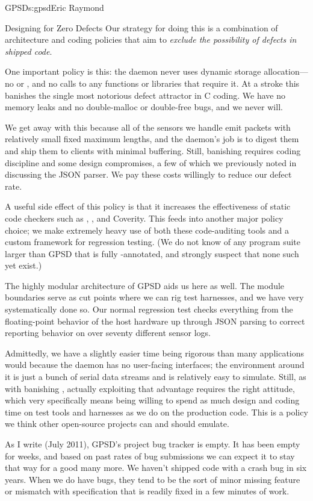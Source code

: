 \begin{aosachapter}{GPSD}{s:gpsd}{Eric Raymond}
\begin{aosasect1}{Designing for Zero Defects}
Our strategy for doing this is a combination of architecture and
coding policies that aim to \emph{exclude the possibility of defects in
shipped code}.

One important policy is this: the  daemon never uses
dynamic storage allocation---no  or , and no
calls to any functions or libraries that require it.  At a stroke
this banishes the single most notorious defect attractor in C coding.
We have no memory leaks and no double-malloc or double-free bugs, and
we never will.

We get away with this because all of the sensors we handle emit
packets with relatively small fixed maximum lengths, and the daemon's
job is to digest them and ship them to clients with minimal buffering.
Still, banishing  requires coding discipline and some
design compromises, a few of which we previously noted in discussing
the JSON parser. We pay these costs willingly to reduce our defect
rate.

A useful side effect of this policy is that it increases the
effectiveness of static code checkers such as ,
, and Coverity.  This feeds into another major policy
choice; we make extremely heavy use of both these code-auditing tools
and a custom framework for regression testing.  (We do not know of any
program suite larger than GPSD that is fully -annotated,
and strongly suspect that none such yet exist.)

The highly modular architecture of GPSD aids us here as well. The
module boundaries serve as cut points where we can rig test harnesses,
and we have very systematically done so.  Our normal regression test
checks everything from the floating-point behavior of the host
hardware up through JSON parsing to correct reporting behavior on over
seventy different sensor logs.

Admittedly, we have a slightly easier time being rigorous than many
applications would because the daemon has no user-facing interfaces;
the environment around it is just a bunch of serial data streams and is
relatively easy to simulate.  Still, as with banishing ,
actually exploiting that advantage requires the right attitude, which
very specifically means being willing to spend as much design and
coding time on test tools and harnesses as we do on the production
code.  This is a policy we think other open-source projects can and
should emulate.

As I write (July 2011), GPSD's project bug tracker is empty.  It has
been empty for weeks, and based on past rates of bug submissions we can
expect it to stay that way for a good many more.  We haven't shipped
code with a crash bug in six years.  When we do have bugs, they tend
to be the sort of minor missing feature or mismatch with specification
that is readily fixed in a few minutes of work.


\end{aosasect1}
\end{aosachapter}
